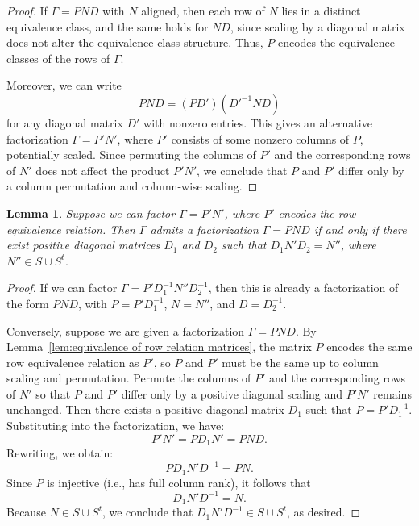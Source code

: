 \documentclass{article}
\newtheorem{lem}{Lemma}
\begin{document}
\begin{proof}
If \( \Gamma = PND \) with \( N \) aligned, then each row of \( N \) lies in a distinct equivalence class, and the same holds for \( ND \), since scaling by a diagonal matrix does not alter the equivalence class structure. Thus, \( P \) encodes the equivalence classes of the rows of \( \Gamma \). 

Moreover, we can write
\[
PND = (P D')(D'^{-1} N D)
\]
for any diagonal matrix \( D' \) with nonzero entries. This gives an alternative factorization \( \Gamma = P'N' \), where \( P' \) consists of some nonzero columns of \( P \), potentially scaled. Since permuting the columns of \( P' \) and the corresponding rows of \( N' \) does not affect the product \( P'N' \), we conclude that \( P \) and \( P' \) differ only by a column permutation and column-wise scaling.
\end{proof}



\begin{lem}
Suppose we can factor \( \Gamma = P'N' \), where \( P' \) encodes the row equivalence relation. Then \( \Gamma \) admits a factorization \( \Gamma = PND \) if and only if there exist positive diagonal matrices \( D_1 \) and \( D_2 \) such that \( D_1 N' D_2 = N'' \), where \( N'' \in S \cup S^t \).
\end{lem}

\begin{proof}
If we can factor \( \Gamma = P' D_1^{-1} N'' D_2^{-1} \), then this is already a factorization of the form \( PND \), with \( P = P' D_1^{-1} \), \( N = N'' \), and \( D = D_2^{-1} \).

Conversely, suppose we are given a factorization \( \Gamma = PND \). By Lemma~\ref{lem:equivalence of row relation matrices}, the matrix \( P \) encodes the same row equivalence relation as \( P' \), so \( P \) and \( P' \) must be the same up to column scaling and permutation. Permute the columns of \( P' \) and the corresponding rows of \( N' \) so that \( P \) and \( P' \) differ only by a positive diagonal scaling and $P'N'$ remains unchanged. Then there exists a positive diagonal matrix \( D_1 \) such that \( P = P' D_1^{-1} \). Substituting into the factorization, we have:
\[
P'N' = P D_1 N' = PND.
\]
Rewriting, we obtain:
\[
P D_1 N' D^{-1} = PN.
\]
Since \( P \) is injective (i.e., has full column rank), it follows that
\[
D_1 N' D^{-1} = N.
\]
Because \( N \in S \cup S^t \), we conclude that \( D_1 N' D^{-1} \in S \cup S^t \), as desired.
\end{proof}
\end{document}
